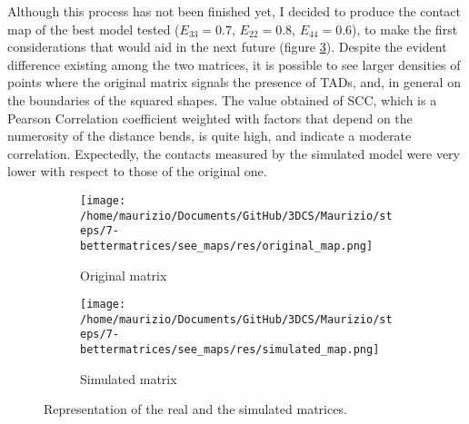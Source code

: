 Although this process has not been finished yet, I decided to produce the contact map of the best model tested ($E_{33} = 0.7$, $E_{22} = 0.8$, $E_{44} = 0.6$), to make the first considerations that would aid in the next future (figure \ref{fig: matrices}). Despite the evident difference existing among the two matrices, it is possible to see larger densities of points where the original matrix signals the presence of TADs, and, in general on the boundaries of the squared shapes. The value obtained of SCC, which is a Pearson Correlation coefficient weighted with factors that depend on the numerosity of the distance bends, is quite high, and indicate a moderate correlation.
Expectedly, the contacts measured by the simulated model were very lower with respect to those of the original one.


\begin{figure}[H]
    \centering
    
    \begin{subfigure}{0.40\textwidth}
      \texttt{[image: /home/maurizio/Documents/GitHub/3DCS/Maurizio/steps/7-bettermatrices/see\_maps/res/original\_map.png]}
      \caption{Original matrix}
      \label{fig: original matrix}
    \end{subfigure}
    \hfill
    \begin{subfigure}{0.40\textwidth}
      \texttt{[image: /home/maurizio/Documents/GitHub/3DCS/Maurizio/steps/7-bettermatrices/see\_maps/res/simulated\_map.png]}
      \caption{Simulated matrix}
      \label{fig: simulated matrix}
    \end{subfigure}
  
    \caption{Representation of the real and the simulated matrices.}
    \label{fig: matrices}
\end{figure}


